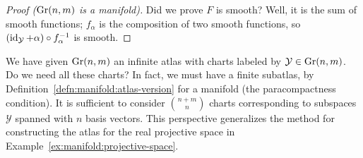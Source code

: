 \begin{proof}[Proof ($\operatorname{Gr}(n,m)$ is a manifold)]
Did we prove $F$ is smooth? Well, it is the sum of smooth functions;
$f_{\alpha}$ is the composition of two smooth functions, so
$(\operatorname{id}_{\mathcal{Y}} + \alpha)\circ f_{\alpha}^{-1}$ is smooth.
\end{proof}

\begin{remark}
We have given $\operatorname{Gr}(n,m)$ an infinite atlas with charts labeled by
$\mathcal{Y}\in\operatorname{Gr}(n,m)$. Do we need all these charts? In fact,
we must have a finite subatlas, by
Definition~\ref{defn:manifold:atlas-version} for a manifold (the
paracompactness condition). It is sufficient to consider $\binom{n+m}{n}$ charts
corresponding to subspaces $\mathcal{Y}$ spanned with $n$ basis vectors.
This perspective generalizes the method for constructing the atlas for
the real projective space in Example~\ref{ex:manifold:projective-space}.
\end{remark}

\endinput
